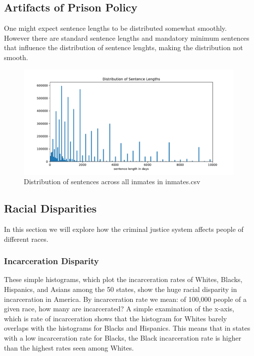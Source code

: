 \documentclass[11pt]{article}
\begin{document}
    \hypertarget{artifacts-of-prison-policy}{%
\subsection{Artifacts of Prison
Policy}\label{artifacts-of-prison-policy}}

One might expect sentence lengths to be distributed somewhat smoothly.
However there are standard sentence lengths and mandatory minimum
sentences that influence the distribution of sentence lenghts, making
the distribution not smooth.

\begin{figure}[H]
    \centering
    \includegraphics[width=\textwidth]{images/sent_dist.pdf}
    \caption{Distribution of sentences across all inmates in inmates.csv}
    \label{fig:my_label}
\end{figure}
    
    \hypertarget{racial-disparities}{%
\subsection{Racial Disparities}\label{racial-disparities}}

In this section we will explore how the criminal justice system affects
people of different races.

\hypertarget{incarceration-disparity}{%
\subsubsection{Incarceration Disparity}\label{incarceration-disparity}}

These simple histograms, which plot the incarceration rates of Whites,
Blacks, Hispanics, and Asians among the 50 states, show the huge racial
disparity in incarceration in America. By incarceration rate we mean: of
100,000 people of a given race, how many are incarcerated? A simple
examination of the x-axis, which is rate of incarceration shows that the
histogram for Whites barely overlaps with the histograms for Blacks and
Hispanics. This means that in states with a low incarceration rate for
Blacks, the Black incarceration rate is higher than the highest rates
seen among Whites.
\end{document}
